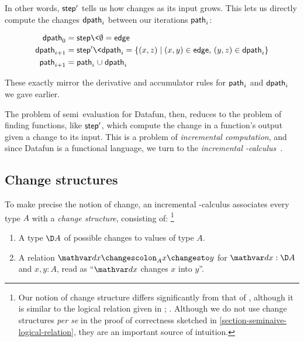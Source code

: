 \noindent
In other words, $\text{\sffamily step}'$ tells us how  changes as its input
grows.
%
This lets us directly compute the changes $\text{\sffamily dpath}_i$ between our
iterations $\text{\sffamily path}_i$:

\begin{align*}
  \name{dpath}_0
  &= \name{step}\<\emptyset
  = \name{edge}
  \\
  \name{dpath}_{i+1}
  &= \name{step}'\<\name{dpath}_i
  = \setfor{(x,z)}{(x,y) \in \name{edge},\, (y,z) \in \name{dpath}_i}
  \\
  \name{path}_{i+1}
  &= \name{path}_i \cup \name{dpath}_i
\end{align*}

\noindent These exactly mirror the derivative and accumulator rules for
\(\text{\sffamily path}_i\) and \(\text{\sffamily dpath}_i\) we gave earlier.

The problem of semi\naive\ evaluation for Datafun, then, reduces to the problem
of finding functions, like $\text{\sffamily step}'$, which compute the change in a
function's output given a change to its input.
%
This is a problem of \emph{incremental computation}, and since Datafun is a
functional language, we turn to the \emph{incremental
  \fn-calculus}~\citep{incremental,DBLP:conf/esop/GiarrussoRS19}.


\subsection{Change structures}
\label{section-change-structures}

To make precise the notion of change, an incremental \fn-calculus associates
every type $A$ with a \emph{change structure}, consisting of:%
%
\footnote{Our notion of change structure differs significantly from that of
  \citet{incremental}, although it is similar to the logical relation given in
  \citet{DBLP:conf/esop/GiarrussoRS19}; . Although we do not use change
  structures \emph{per se} in the proof of correctness sketched in
  \cref{section-seminaive-logical-relation}, they are an important source of
  intuition.}

\begin{enumerate}
\item A type $\D A$ of possible changes to values of type $A$.
\item A relation $\changesat{A}{\dx}{x}{y}$ for $\dx : \D A$ and $x,y : A$,
  read as ``$\dx$ changes $x$ into $y$''.
\end{enumerate}

